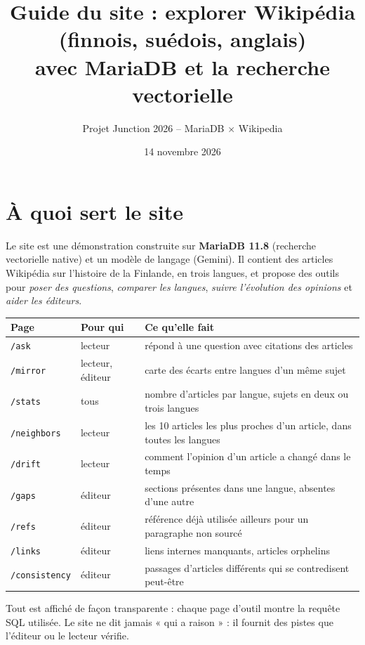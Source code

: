 \documentclass[11pt,a4paper]{article}
\title{Guide du site : explorer Wikipédia (finnois, suédois, anglais)\\avec MariaDB et la recherche vectorielle}
\author{Projet Junction 2026 -- MariaDB $\times$ Wikipedia}
\date{14 novembre 2026}
\begin{document}
\maketitle
\tableofcontents

\section{À quoi sert le site}
Le site est une démonstration construite sur \textbf{MariaDB 11.8} (recherche vectorielle native) et un modèle de langage (Gemini). Il contient des articles Wikipédia sur l'histoire de la Finlande, en trois langues, et propose des outils pour \emph{poser des questions}, \emph{comparer les langues}, \emph{suivre l'évolution des opinions} et \emph{aider les éditeurs}.

\begin{table}[H]\centering\small
\begin{tabular}{@{}lll@{}}\toprule
Page & Pour qui & Ce qu'elle fait\\\midrule
\texttt{/ask} & lecteur & répond à une question avec citations des articles\\
\texttt{/mirror} & lecteur, éditeur & carte des écarts entre langues d'un même sujet\\
\texttt{/stats} & tous & nombre d'articles par langue, sujets en deux ou trois langues\\
\texttt{/neighbors} & lecteur & les 10 articles les plus proches d'un article, dans toutes les langues\\
\texttt{/drift} & lecteur & comment l'opinion d'un article a changé dans le temps\\
\texttt{/gaps} & éditeur & sections présentes dans une langue, absentes d'une autre\\
\texttt{/refs} & éditeur & référence déjà utilisée ailleurs pour un paragraphe non sourcé\\
\texttt{/links} & éditeur & liens internes manquants, articles orphelins\\
\texttt{/consistency} & éditeur & passages d'articles différents qui se contredisent peut-être\\\bottomrule
\end{tabular}
\end{table}

Tout est affiché de façon transparente : chaque page d'outil montre la requête SQL utilisée. Le site ne dit jamais « qui a raison » : il fournit des pistes que l'éditeur ou le lecteur vérifie.
\end{document}
